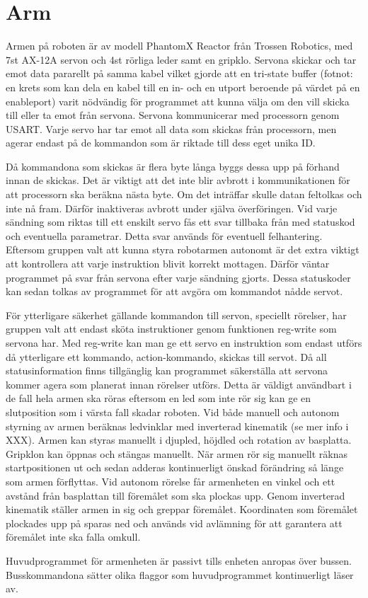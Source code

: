 \section{Arm}

Armen på roboten är av modell PhantomX Reactor från Trossen Robotics, med 7st AX-12A servon och 4st rörliga leder samt en gripklo. Servona skickar och tar emot data pararellt på samma kabel vilket gjorde att en tri-state buffer (fotnot: en krets som kan dela en kabel till en in- och en utport beroende på värdet på en enableport) varit nödvändig för programmet att kunna välja om den vill skicka till eller ta emot från servona. Servona kommunicerar med processorn genom USART. Varje servo har tar emot all data som skickas från processorn, men agerar endast på de kommandon som är riktade till dess eget unika ID.

Då kommandona som skickas är flera byte långa byggs dessa upp på förhand innan de skickas. Det är viktigt att det inte blir avbrott i kommunikationen för att processorn ska beräkna nästa byte. Om det inträffar skulle datan feltolkas och inte nå fram. Därför inaktiveras avbrott under själva överföringen. Vid varje sändning som riktas till ett enskilt servo fås ett svar tillbaka från med statuskod och eventuella parametrar. Detta svar används för eventuell felhantering. Eftersom gruppen valt att kunna styra robotarmen autonomt är det extra viktigt att kontrollera att varje instruktion blivit korrekt mottagen. Därför väntar programmet på svar från servona efter varje sändning gjorts. Dessa statuskoder kan sedan tolkas av programmet för att avgöra om kommandot nådde servot.

För ytterligare säkerhet gällande kommandon till servon, speciellt rörelser, har gruppen valt att endast sköta instruktioner genom funktionen reg-write som servona har. Med reg-write kan man ge ett servo en instruktion som endast utförs då ytterligare ett kommando, action-kommando, skickas till servot. Då all statusinformation finns tillgänglig kan programmet säkerställa att servona kommer agera som planerat innan rörelser utförs. Detta är väldigt användbart i de fall hela armen ska röras eftersom en led som inte rör sig kan ge en slutposition som i värsta fall skadar roboten.
Vid både manuell och autonom styrning av armen beräknas ledvinklar med inverterad kinematik (se mer info i XXX). Armen kan styras manuellt i djupled, höjdled och rotation av basplatta. Gripklon kan öppnas och stängas manuellt. När armen rör sig manuellt räknas startpositionen ut och sedan adderas kontinuerligt önskad förändring så länge som armen förflyttas. Vid autonom rörelse får armenheten en vinkel och ett avstånd från basplattan till föremålet som ska plockas upp. Genom inverterad kinematik ställer armen in sig och greppar föremålet. Koordinaten som föremålet plockades upp på sparas ned och används vid avlämning för att garantera att föremålet inte ska falla omkull.

Huvudprogrammet för armenheten är passivt tills enheten anropas över bussen. Busskommandona sätter olika flaggor som huvudprogrammet kontinuerligt läser av.
